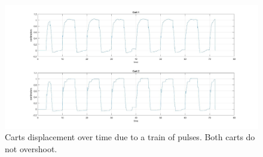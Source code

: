 \begin{figure}[h]
	\centering
	\includegraphics[width=0.9\linewidth]{img/hinf_response}
	\caption{Carts displacement over time due to a train of pulses. Both carts do not overshoot.}
	\label{fig:2dofcarts}
\end{figure}